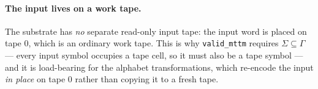 \paragraph{The input lives on a work tape.}  The substrate has
\emph{no} separate read-only input tape: the input word is placed on
tape $0$, which is an ordinary work tape.  This is why
\texttt{valid\_mttm} requires $\Sigma \subseteq \Gamma$ --- every input
symbol occupies a tape cell, so it must also be a tape symbol --- and it
is load-bearing for the alphabet transformations, which re-encode the
input \emph{in place} on tape $0$ rather than copying it to a fresh
tape.

